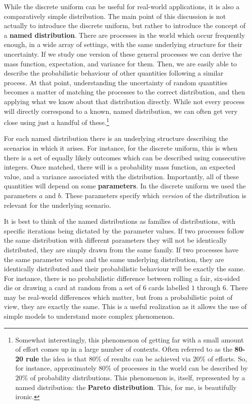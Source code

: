 \documentclass[
  letterpaper,
  DIV=11,
  numbers=noendperiod]{scrreprt}
\theoremstyle{definition}
\theoremstyle{definition}
\theoremstyle{definition}
\theoremstyle{remark}
\begin{document}
While the discrete uniform can be useful for real-world applications, it
is also a comparatively simple distribution. The main point of this
discussion is not actually to introduce the discrete uniform, but rather
to introduce the concept of a \textbf{named distribution}. There are
processes in the world which occur frequently enough, in a wide array of
settings, with the same underlying structure for their uncertainty. If
we study one version of these general processes we can derive the mass
function, expectation, and variance for them. Then, we are easily able
to describe the probabilistic behaviour of other quantities following a
similar process. At that point, understanding the uncertainty of random
quantities becomes a matter of matching the processes to the correct
distribution, and then applying what we know about that distribution
directly. While not every process will directly correspond to a known,
named distribution, we can often get very close using just a handful of
these.\footnote{Somewhat interestingly, this phenomenon of getting far
  with a small amount of effort comes up in a large number of contexts.
  Often referred to as the \textbf{80-20 rule} the idea is that \(80\%\)
  of results can be achieved via \(20\%\) of efforts. So, for instance,
  approximately \(80\%\) of processes in the world can be described by
  \(20\%\) of probability distributions. This phenomenon is, itself,
  represented by a named distribution: the \textbf{Pareto distribution}.
  This, for me, is beautifully ironic.}

For each named distribution there is an underlying structure describing
the scenarios in which it arises. For instance, for the discrete
uniform, this is when there is a set of equally likely outcomes which
can be described using consecutive integers. Once matched, there will is
a probability mass function, an expected value, and a variance
associated with the distribution. Importantly, all of these quantities
will depend on some \textbf{parameters}. In the discrete uniform we used
the parameters \(a\) and \(b\). These parameters specify which
\emph{version} of the distribution is relevant for the underlying
scenario.

It is best to think of the named distributions as families of
distributions, with specific iterations being dictated by the parameter
values. If two processes follow the same distribution with different
parameters they will not be identically distributed, they are simply
drawn from the same family. If two processes have the same parameter
values and the same underlying distribution, they are identically
distributed and their probabilistic behaviour will be exactly the same.
For instance, there is no probabilistic difference between rolling a
fair, six-sided die or drawing a card at random from a set of \(6\)
cards labelled \(1\) through \(6\). There may be real-world differences
which matter, but from a probabilistic point of view, they are exactly
the same. This is a useful realization as it allows the use of simple
models to understand more complex phenomenon.
\end{document}
